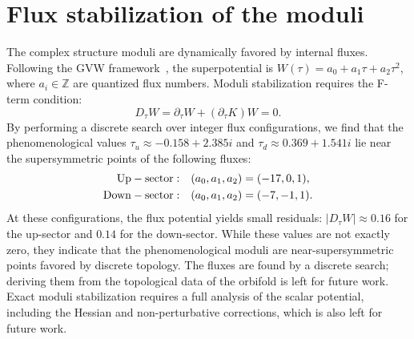 \documentclass[12pt,a4paper]{article}
\numberwithin{equation}{section}
\begin{document}
\section{Flux stabilization of the moduli}
The complex structure moduli are dynamically favored by internal fluxes. Following the GVW framework~\cite{GVW2000}, the superpotential is \(W(\tau) = a_0 + a_1\tau + a_2\tau^2\), where \(a_i \in \mathbb{Z}\) are quantized flux numbers. Moduli stabilization requires the F-term condition:
\begin{equation}
D_{\tau}W = \partial_{\tau}W + (\partial_{\tau}K)W = 0.
\end{equation}
By performing a discrete search over integer flux configurations, we find that the phenomenological values \(\tau_u \approx -0.158 + 2.385i\) and \(\tau_d \approx 0.369 + 1.541i\) lie near the supersymmetric points of the following fluxes:
\begin{equation}
\begin{split}
{\rm Up-sector:}&\quad (a_0,a_1,a_2) = (-17,0,1),\\
{\rm Down-sector:}&\quad (a_0,a_1,a_2) = (-7,-1,1).
\end{split}
\end{equation}
At these configurations, the flux potential yields small residuals: \(|D_{\tau}W| \approx 0.16\) for the up-sector and \(0.14\) for the down-sector. While these values are not exactly zero, they indicate that the phenomenological moduli are near-supersymmetric points favored by discrete topology. The fluxes are found by a discrete search; deriving them from the topological data of the orbifold is left for future work. Exact moduli stabilization requires a full analysis of the scalar potential, including the Hessian and non-perturbative corrections, which is also left for future work.
\end{document}
